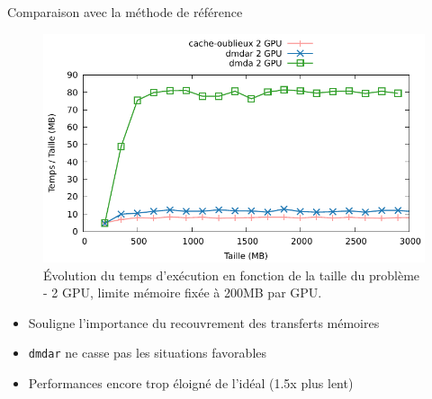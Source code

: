 \documentclass[9pt]{beamer}
\begin{document}
\begin{frame}{\textcolor{inriaGrey}{Comparaison avec la méthode de référence}}
  \begin{figure}
    \centering
    \includegraphics[width=0.7\linewidth]{exp/perf_gpu2_limit200.pdf}
    \caption{Évolution du temps d'exécution en fonction de la taille du problème
      - 2 GPU, limite mémoire fixée à 200MB par GPU.}
  \end{figure}
  \vfill
  \begin{itemize}
  \item<2-> Souligne l'importance du recouvrement des transferts mémoires
  \vfill
  \item<3-> \texttt{dmdar} ne casse pas les situations favorables
  \vfill
  \item<4-> Performances encore trop éloigné de l'idéal (1.5x plus lent)
  \end{itemize}
  \vfill
\end{frame}
\end{document}
